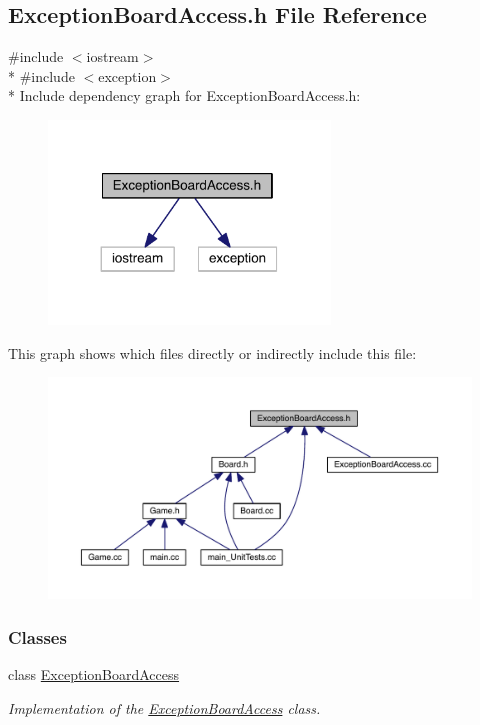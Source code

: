 \hypertarget{a00102}{}\subsection{Exception\+Board\+Access.\+h File Reference}
\label{a00102}
{\ttfamily \#include $<$iostream$>$}\\*
{\ttfamily \#include $<$exception$>$}\\*
Include dependency graph for Exception\+Board\+Access.\+h\+:\nopagebreak
\begin{figure}[H]
\begin{center}
\leavevmode
\includegraphics[width=212pt]{a00135}
\end{center}
\end{figure}
This graph shows which files directly or indirectly include this file\+:\nopagebreak
\begin{figure}[H]
\begin{center}
\leavevmode
\includegraphics[width=350pt]{a00136}
\end{center}
\end{figure}
\subsubsection*{Classes}
\begin{DoxyCompactItemize}
\item 
class \hyperlink{a00025}{Exception\+Board\+Access}
\begin{DoxyCompactList}\small\item\em Implementation of the \hyperlink{a00025}{Exception\+Board\+Access} class. \end{DoxyCompactList}\end{DoxyCompactItemize}

